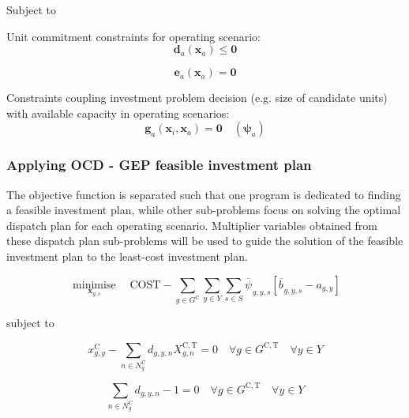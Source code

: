\documentclass{article}
\newcommand{\sGeneratorsCandidate}{G^{\mathrm{C}}}
\newcommand{\sGeneratorsCandidateThermal}{G^{\mathrm{C,T}}}
\newcommand{\sYears}{Y}
\newcommand{\sScenarios}{S}
\newcommand{\sInvestmentSizeOptions}{N^{\mathrm{C}}}
\newcommand{\sInvestmentSizeOptionsGenerator}[1][\iGenerator]{\sInvestmentSizeOptions_{#1}}
\newcommand{\iGenerator}{g}
\newcommand{\iYear}{y}
\newcommand{\iScenario}{s}
\newcommand{\iInvestmentSizeOption}{n}
\newcommand{\cInvestmentSize}{X^{\mathrm{C,T}}_{\iGenerator,\iInvestmentSizeOption}}
\newcommand{\cObjectiveFunction}{\mathrm{COST}}
\newcommand{\vInstalledCapacity}[1][\iGenerator,\iYear]{x^{\mathrm{C}}_{#1}}
\newcommand{\vInvestmentSizeIndicator}[1][\iGenerator,\iYear,\iInvestmentSizeOption]{d_{#1}}
\newcommand{\vInstalledCapacityTotal}[1][\iGenerator,\iYear]{a_{#1}}
\newcommand{\vInstalledCapacityTotalScenario}[1][\iGenerator,\iYear,\iScenario]{b_{#1}}
\newcommand{\vFixedCapacityDual}[1][\iGenerator,\iYear,\iScenario]{\psi_{#1}}
\DeclareMathOperator*{\minimise}{minimise}
\begin{document}
Subject to

Unit commitment constraints for operating scenario:
\begin{equation}
\bm{d}_{a}\left(\bm{x}_{a}\right) \leq \bm{0}
\end{equation}

\begin{equation}
\bm{e}_{a}\left(\bm{x}_{a}\right) = \bm{0}
\end{equation}

Constraints coupling investment problem decision (e.g. size of candidate units) with available capacity in operating scenarios:
\begin{equation}
\bm{g}_{a}\left(\bm{x}_{i}, \bm{x}_{a}\right) = \bm{0} \quad (\bm{\psi}_{a})
\end{equation}


\subsubsection{Applying OCD - GEP feasible investment plan}

The objective function is separated such that one program is dedicated to finding a feasible investment plan, while other sub-problems focus on solving the optimal dispatch plan for each operating scenario. Multiplier variables obtained from these dispatch plan sub-problems will be used to guide the solution of the feasible investment plan to the least-cost investment plan.

\begin{equation}
\minimise\limits_{\bm{x}_{\iYear,\iScenario}} \quad \cObjectiveFunction - \sum\limits_{\iGenerator \in \sGeneratorsCandidate}\sum\limits_{\iYear \in \sYears}\sum\limits_{\iScenario \in \sScenarios} \overline{\vFixedCapacityDual[]}_{\iGenerator,\iYear,\iScenario}\left[\overline{\vInstalledCapacityTotalScenario[]}_{\iGenerator,\iYear,\iScenario} - \vInstalledCapacityTotal\right]
\end{equation}

subject to

\begin{equation}
\vInstalledCapacity - \sum\limits_{\iInvestmentSizeOption \in \sInvestmentSizeOptionsGenerator} \vInvestmentSizeIndicator \cInvestmentSize = 0 \quad \forall \iGenerator \in \sGeneratorsCandidateThermal \quad \forall \iYear \in \sYears
\label{eqn: discrete capacity decision}
\end{equation}

\begin{equation}
\sum\limits_{\iInvestmentSizeOption \in \sInvestmentSizeOptionsGenerator} \vInvestmentSizeIndicator - 1 = 0 \quad \forall \iGenerator \in \sGeneratorsCandidateThermal \quad \forall \iYear \in \sYears
\end{equation}
\end{document}
